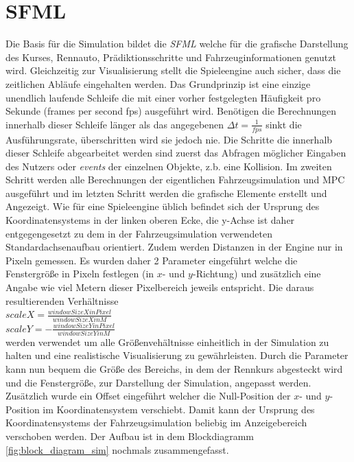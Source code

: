 \documentclass{like}
\begin{document}
\section{\acl{SFML}}
Die Basis für die Simulation bildet die \emph{ \ac{SFML}} welche für die grafische Darstellung des Kurses, Rennauto, Prädiktionsschritte und Fahrzeuginformationen genutzt wird. Gleichzeitig zur Visualisierung stellt die Spieleengine auch sicher, dass die zeitlichen Abläufe eingehalten werden. Das Grundprinzip ist eine einzige unendlich laufende Schleife die mit einer vorher festgelegten Häufigkeit pro Sekunde (frames per second fps) ausgeführt wird. Benötigen die Berechnungen innerhalb dieser Schleife länger als das angegebenen $\Delta t = \frac{1}{fps}$ sinkt die Ausführungsrate, überschritten wird sie jedoch nie. Die Schritte die innerhalb dieser Schleife abgearbeitet werden sind zuerst das Abfragen möglicher Eingaben des Nutzers oder \emph{events} der einzelnen Objekte, z.b. eine Kollision. Im zweiten Schritt werden alle Berechnungen der eigentlichen Fahrzeugsimulation und \ac{MPC} ausgeführt und im letzten Schritt werden die grafische Elemente erstellt und Angezeigt. Wie für eine Spieleengine üblich befindet sich der Ursprung des Koordinatensystems in der linken oberen Ecke, die y-Achse ist daher entgegengesetzt zu dem in der Fahrzeugsimulation verwendeten Standardachsenaufbau orientiert. Zudem werden Distanzen in der Engine nur in Pixeln gemessen. Es wurden daher 2 Parameter eingeführt welche die Fenstergröße in Pixeln festlegen (in \(x\)- und  \(y\)-Richtung)
und zusätzlich eine Angabe wie viel Metern dieser Pixelbereich jeweils entspricht. Die daraus resultierenden Verhältnisse \\
$scaleX = \frac{windowSizeXinPixel}{windowSizeXinM}$ \\
$scaleY = - \frac{windowSizeYinPixel}{windowSizeYinM}$ \\
werden verwendet um alle Größenvehältnisse einheitlich in der Simulation zu halten und eine realistische Visualisierung zu gewährleisten. Durch die Parameter kann nun bequem die Größe des Bereichs, in dem der Rennkurs abgesteckt wird und die Fenstergröße, zur Darstellung der Simulation, angepasst werden. Zusätzlich wurde ein Offset eingeführt welcher die Null-Position der \(x\)- und \(y\)- Position im Koordinatensystem verschiebt. Damit kann der Ursprung des Koordinatensystems der Fahrzeugsimulation beliebig im Anzeigebereich verschoben werden. 
Der Aufbau ist in dem Blockdiagramm \ref{fig:block_diagram_sim} nochmals zusammengefasst. 
\end{document}

